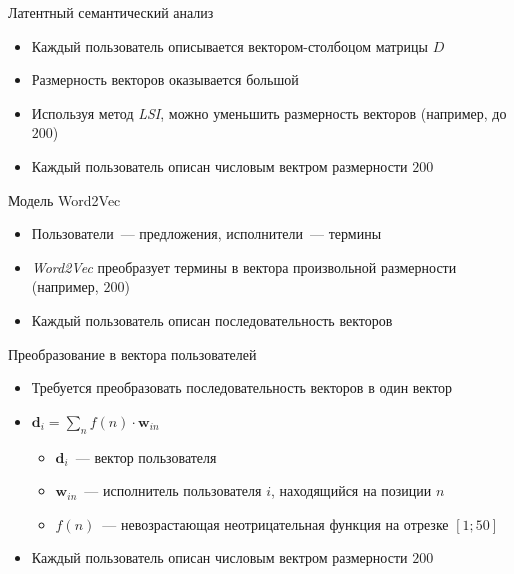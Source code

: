 \documentclass{beamer}
\begin{document}
\begin{frame}{Латентный семантический анализ}
  \begin{itemize}
      \item {Каждый пользователь описывается вектором-столбоцом матрицы $D$}
      \item {Размерность векторов оказывается большой}
      \item {Используя метод \textit{LSI}, можно уменьшить размерность векторов (например, до $200$)}
      \item {Каждый пользователь описан числовым вектром размерности $200$}
  \end{itemize}
\end{frame}

\begin{frame}{Модель Word2Vec}
  \begin{itemize}
      \item {Пользователи~--- предложения, исполнители~--- термины}
      \item {\textit{Word2Vec} преобразует термины в вектора произвольной размерности (например, $200$)}
      \item {Каждый пользователь описан последовательность векторов} 
  \end{itemize}
\end{frame}

\begin{frame}{Преобразование в вектора пользователей}
  \begin{itemize}
      \item {Требуется преобразовать последовательность векторов в один вектор}
      \item {$\bm{d}_{i} = \sum\limits_{n}{f(n) \cdot \bm{w}_{in}}$}
          \begin{itemize}
              \item {$\bm{d}_{i}$~--- вектор пользователя}
              \item {$\bm{w}_{in}$~--- исполнитель пользователя $i$, находящийся на позиции $n$}
              \item {$f(n)$~--- невозрастающая неотрицательная функция на отрезке $[1; 50]$}
          \end{itemize}
      \item {Каждый пользователь описан числовым вектром размерности $200$}
  \end{itemize}
\end{frame}
\end{document}
